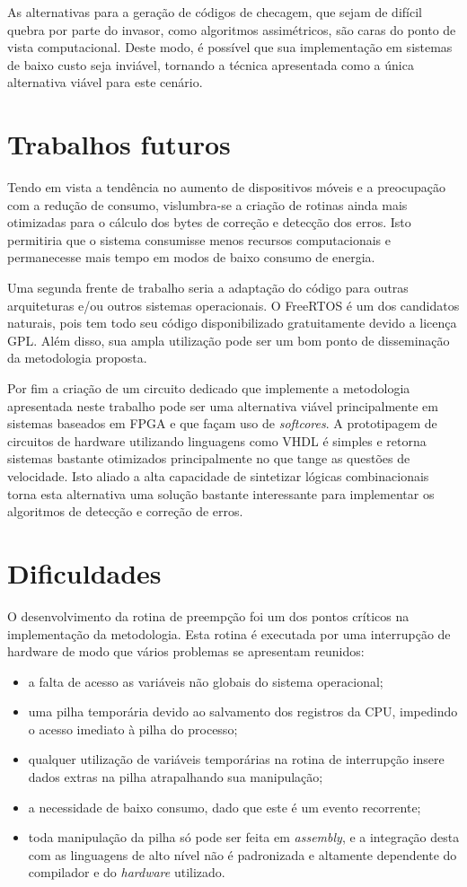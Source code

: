 \documentclass[12pt,openright,oneside,a4paper,brazil]{abntex2}
\begin{document}
As alternativas para a geração de códigos de checagem, que sejam de difícil quebra por parte do invasor, como algoritmos assimétricos, são caras do ponto de vista computacional. Deste modo, é possível que sua implementação em sistemas de baixo custo seja inviável, tornando a técnica apresentada como a única alternativa viável para este cenário.

\section{Trabalhos futuros}
Tendo em vista a tendência no aumento de dispositivos móveis e a preocupação com a redução de consumo, vislumbra-se a criação de rotinas ainda mais otimizadas para o cálculo dos bytes de correção e detecção dos erros. Isto permitiria que o sistema consumisse menos recursos computacionais e permanecesse mais tempo em modos de baixo consumo de energia.

Uma segunda frente de trabalho seria a adaptação do código para outras arquiteturas e/ou outros sistemas operacionais. O FreeRTOS é um dos candidatos naturais, pois tem todo seu código disponibilizado gratuitamente devido a licença GPL. Além disso, sua ampla utilização pode ser um bom ponto de disseminação da metodologia proposta.

Por fim a criação de um circuito dedicado que implemente a metodologia apresentada neste trabalho pode ser uma alternativa viável principalmente em sistemas baseados em FPGA e que façam uso de \textit{softcores}. A prototipagem de circuitos de hardware utilizando linguagens como VHDL é simples e retorna sistemas bastante otimizados principalmente no que tange as questões de velocidade. Isto aliado a alta capacidade de sintetizar lógicas combinacionais torna esta alternativa uma solução bastante interessante para implementar os algoritmos de detecção e correção de erros.

\section{Dificuldades}

O desenvolvimento da rotina de preempção foi um dos pontos críticos na implementação da metodologia. Esta rotina é executada por uma interrupção de hardware de modo que vários problemas se apresentam reunidos:
\begin{itemize}
\item a falta de acesso as variáveis não globais do sistema operacional;
\item uma pilha temporária devido ao salvamento dos registros da CPU, impedindo o acesso imediato à pilha do processo;
\item qualquer utilização de variáveis temporárias na rotina de interrupção insere dados extras na pilha atrapalhando sua manipulação;
\item a necessidade de baixo consumo, dado que este é um evento recorrente;
\item toda manipulação da pilha só pode ser feita em \textit{assembly}, e a integração desta com as linguagens de alto nível não é padronizada e altamente dependente do compilador e do \textit{hardware} utilizado. 
\end{itemize}
\end{document}
